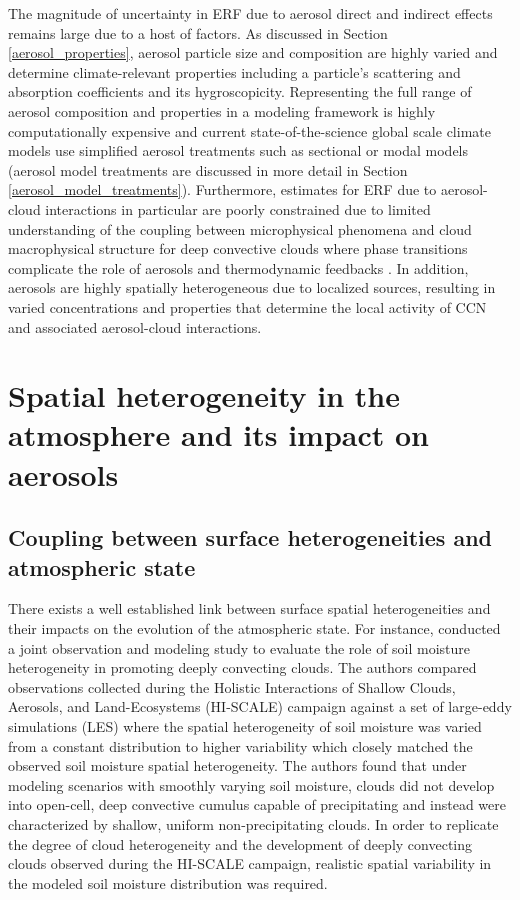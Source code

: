 The magnitude of uncertainty in ERF due to aerosol direct and indirect effects remains large due to a host of factors. As discussed in Section \ref{aerosol_properties}, aerosol particle size and composition are highly varied and determine climate-relevant properties including a particle's scattering and absorption coefficients and its hygroscopicity. Representing the full range of aerosol composition and properties in a modeling framework is highly computationally expensive and current state-of-the-science global scale climate models use simplified aerosol treatments such as sectional or modal models (aerosol model treatments are discussed in more detail in Section \ref{aerosol_model_treatments}). Furthermore, estimates for ERF due to aerosol-cloud interactions in particular are poorly constrained due to limited understanding of the coupling between microphysical phenomena and cloud macrophysical structure for deep convective clouds where phase transitions complicate the role of aerosols and thermodynamic feedbacks \parencite{fan_review_2016}. In addition, aerosols are highly spatially heterogeneous due to localized sources, resulting in varied concentrations and properties that determine the local activity of CCN and associated aerosol-cloud interactions.

\section{Spatial heterogeneity in the atmosphere and its impact on aerosols}

\subsection{Coupling between surface heterogeneities and atmospheric state}

There exists a well established link between surface spatial heterogeneities and their impacts on the evolution of the atmospheric state. For instance, \textcite{fast_impact_2019} conducted a joint observation and modeling study to evaluate the role of soil moisture heterogeneity in promoting deeply convecting clouds. The authors compared observations collected during the Holistic Interactions of Shallow Clouds, Aerosols, and Land-Ecosystems (HI-SCALE) campaign against a set of large-eddy simulations (LES) where the spatial heterogeneity of soil moisture was varied from a constant distribution to higher variability which closely matched the observed soil moisture spatial heterogeneity.  The authors found that under modeling scenarios with smoothly varying soil moisture, clouds did not develop into open-cell, deep convective cumulus capable of precipitating and instead were characterized by shallow, uniform non-precipitating clouds. In order to replicate the degree of cloud heterogeneity and the development of deeply convecting clouds observed during the HI-SCALE campaign, realistic spatial variability in the modeled soil moisture distribution was required. 

